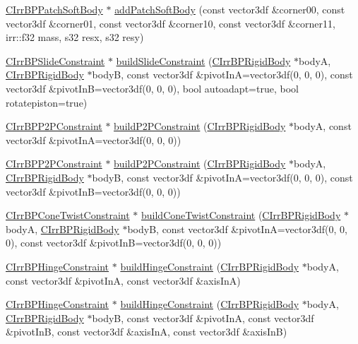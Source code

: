 \begin{DoxyCompactItemize}
\item 
\hyperlink{class_c_irr_b_p_patch_soft_body}{CIrrBPPatchSoftBody} $\ast$ \hyperlink{class_c_irr_b_p_manager_a4014de850508351affc43026a34a70bb}{addPatchSoftBody} (const vector3df \&corner00, const vector3df \&corner01, const vector3df \&corner10, const vector3df \&corner11, irr::f32 mass, s32 resx, s32 resy)
\item 
\hyperlink{class_c_irr_b_p_slide_constraint}{CIrrBPSlideConstraint} $\ast$ \hyperlink{class_c_irr_b_p_manager_af916152de29ba8c7c9e727dfe5a1c8af}{buildSlideConstraint} (\hyperlink{class_c_irr_b_p_rigid_body}{CIrrBPRigidBody} $\ast$bodyA, \hyperlink{class_c_irr_b_p_rigid_body}{CIrrBPRigidBody} $\ast$bodyB, const vector3df \&pivotInA=vector3df(0, 0, 0), const vector3df \&pivotInB=vector3df(0, 0, 0), bool autoadapt=true, bool rotatepiston=true)
\item 
\hyperlink{class_c_irr_b_p_p2_p_constraint}{CIrrBPP2PConstraint} $\ast$ \hyperlink{class_c_irr_b_p_manager_a19a7a9108ded5c076d307efdb390d58a}{buildP2PConstraint} (\hyperlink{class_c_irr_b_p_rigid_body}{CIrrBPRigidBody} $\ast$bodyA, const vector3df \&pivotInA=vector3df(0, 0, 0))
\item 
\hyperlink{class_c_irr_b_p_p2_p_constraint}{CIrrBPP2PConstraint} $\ast$ \hyperlink{class_c_irr_b_p_manager_a1a2dc64a93a8770dfed3ba7f77972c70}{buildP2PConstraint} (\hyperlink{class_c_irr_b_p_rigid_body}{CIrrBPRigidBody} $\ast$bodyA, \hyperlink{class_c_irr_b_p_rigid_body}{CIrrBPRigidBody} $\ast$bodyB, const vector3df \&pivotInA=vector3df(0, 0, 0), const vector3df \&pivotInB=vector3df(0, 0, 0))
\item 
\hyperlink{class_c_irr_b_p_cone_twist_constraint}{CIrrBPConeTwistConstraint} $\ast$ \hyperlink{class_c_irr_b_p_manager_ae6c1ebbc11dec61a856bcc7b5c6394ce}{buildConeTwistConstraint} (\hyperlink{class_c_irr_b_p_rigid_body}{CIrrBPRigidBody} $\ast$bodyA, \hyperlink{class_c_irr_b_p_rigid_body}{CIrrBPRigidBody} $\ast$bodyB, const vector3df \&pivotInA=vector3df(0, 0, 0), const vector3df \&pivotInB=vector3df(0, 0, 0))
\item 
\hyperlink{class_c_irr_b_p_hinge_constraint}{CIrrBPHingeConstraint} $\ast$ \hyperlink{class_c_irr_b_p_manager_a87b2610eaba14775ac81992ff71ab436}{buildHingeConstraint} (\hyperlink{class_c_irr_b_p_rigid_body}{CIrrBPRigidBody} $\ast$bodyA, const vector3df \&pivotInA, const vector3df \&axisInA)
\item 
\hyperlink{class_c_irr_b_p_hinge_constraint}{CIrrBPHingeConstraint} $\ast$ \hyperlink{class_c_irr_b_p_manager_a8a61e921b487d6249e46022b6e9b5ccf}{buildHingeConstraint} (\hyperlink{class_c_irr_b_p_rigid_body}{CIrrBPRigidBody} $\ast$bodyA, \hyperlink{class_c_irr_b_p_rigid_body}{CIrrBPRigidBody} $\ast$bodyB, const vector3df \&pivotInA, const vector3df \&pivotInB, const vector3df \&axisInA, const vector3df \&axisInB)

\end{DoxyCompactItemize}
